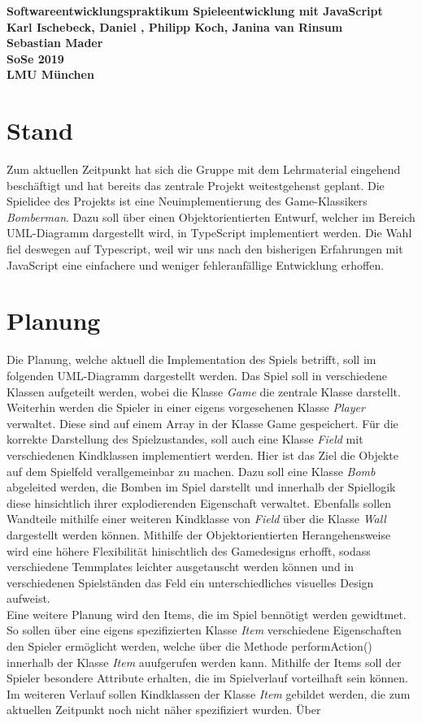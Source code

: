 \documentclass[10pt, a4paper]{report}
\begin{document}
		\begin{center}
		\huge \textbf{Softwareentwicklungspraktikum Spieleentwicklung mit JavaScript}\\
		\vspace{1cm}
		\small 
		\textbf{Karl Ischebeck, Daniel , Philipp Koch, Janina van Rinsum}	\\
		\textbf{Sebastian Mader}									\\
		\textbf{SoSe 2019}											\\
		\textbf{LMU München}
		\vspace{1cm}
	\end{center}
	\section{Stand}
	Zum aktuellen Zeitpunkt hat sich die Gruppe mit dem Lehrmaterial eingehend beschäftigt und hat bereits das zentrale Projekt weitestgehenst geplant. Die Spielidee des Projekts ist eine Neuimplementierung des Game-Klassikers \textit{Bomberman}. Dazu soll über einen Objektorientierten Entwurf, welcher im Bereich UML-Diagramm dargestellt wird, in TypeScript implementiert werden. Die Wahl fiel deswegen auf Typescript, weil wir uns nach den bisherigen Erfahrungen mit JavaScript eine einfachere und weniger fehleranfällige Entwicklung erhoffen.
	\section{Planung}
	Die Planung, welche aktuell die Implementation des Spiels betrifft, soll im folgenden UML-Diagramm dargestellt werden. Das Spiel soll in verschiedene Klassen aufgeteilt werden, wobei die Klasse \textit{Game} die zentrale Klasse darstellt. Weiterhin werden die Spieler in einer eigens vorgesehenen Klasse \textit{Player} verwaltet. Diese sind auf einem Array in der Klasse Game gespeichert. Für die korrekte Darstellung des Spielzustandes, soll auch eine Klasse \textit{Field} mit verschiedenen Kindklassen implementiert werden. Hier ist das Ziel die Objekte auf dem Spielfeld verallgemeinbar zu machen. Dazu soll eine Klasse \textit{Bomb} abgeleited werden, die Bomben im Spiel darstellt und innerhalb der Spiellogik diese hinsichtlich ihrer explodierenden Eigenschaft verwaltet. Ebenfalls sollen Wandteile mithilfe einer weiteren Kindklasse von \textit{Field} über die Klasse \textit{Wall} dargestellt werden können. Mithilfe der Objektorientierten Herangehensweise wird eine höhere Flexibilität hinischtlich des Gamedesigns erhofft, sodass verschiedene Temmplates leichter ausgetauscht werden können und in verschiedenen Spielständen das Feld ein unterschiedliches visuelles Design aufweist.\\
	Eine weitere Planung wird den Items, die im Spiel bennötigt werden gewidtmet. So sollen über eine eigens spezifizierten Klasse \textit{Item} verschiedene Eigenschaften den Spieler ermöglicht werden, welche über die Methode performAction() innerhalb der Klasse \textit{Item} auufgerufen werden kann. Mithilfe der Items soll der Spieler besondere Attribute erhalten, die im Spielverlauf vorteilhaft sein können. Im weiteren Verlauf sollen Kindklassen der Klasse \textit{Item} gebildet werden, die zum aktuellen Zeitpunkt noch nicht näher spezifiziert wurden. Über 
\end{document}
